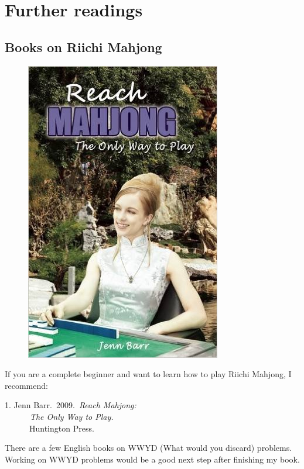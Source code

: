 \chapter{Further readings} \label{ch:read}

\section{Books on Riichi Mahjong}
\begin{figure}
\vspace{-35pt}
\begin{center}
\includegraphics[width=.27\textwidth,clip]{figs/barr1}
\end{center}
\vspace{-50pt}
\end{figure}

\noindent If you are a complete beginner and want to learn how to play Riichi Mahjong, I recommend:

\bigskip
\noindent \hspace{10pt}1. Jenn Barr.~2009.~\textit{Reach Mahjong:}\\\textit{~~~~~~The Only Way to Play.}\\~~~~~~Huntington Press.

\bigskip
\noindent There are a few English books on WWYD (What would you discard) problems. Working on WWYD problems would be a good next step after finishing my book.

